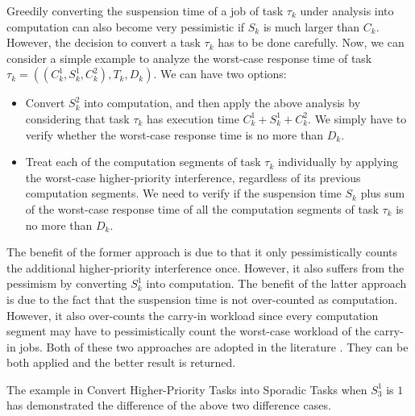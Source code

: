 \begin{table}[t]
\begin{table}[t]
 Greedily converting the suspension time of a job of task $\tau_k$ under analysis into computation can also become very pessimistic if $S_k$ is much larger than $C_k$. However, the decision to convert a task $\tau_k$ has to be done carefully. Now, we can consider a simple example to analyze the worst-case response time of task $\tau_k = ((C_k^1, S_k^1, C_k^2), T_k, D_k)$. We can have two options:
\begin{itemize}
\item Convert $S_k^2$ into computation, and then apply the above analysis by considering that task $\tau_k$ has execution time $C_k^1+S_k^1+C_k^2$. We simply have to verify whether the worst-case response time is no more than $D_k$.
\item Treat each of the computation segments of task $\tau_k$ individually by applying the worst-case higher-priority interference, regardless of its previous computation segments. We need to verify if the suspension time $S_k$ plus sum of the worst-case response time of all the computation segments of task $\tau_k$ is no more than $D_k$. 
\end{itemize}
The benefit of the former approach is due to that it only pessimistically counts the additional higher-priority interference once. However, it also suffers from the pessimism by converting $S_k^1$ into computation. The benefit of the latter approach is due to the fact that the suspension time is not over-counted as computation. However, it also over-counts the carry-in workload since every computation segment may have to pessimistically count the worst-case workload of the carry-in jobs. Both of these two approaches are adopted in the literature \cite{ecrts15nelissen,Huang:multiseg,RTCSA-BletsasA05}. They can be both applied and the better result is returned.

The example in Convert Higher-Priority Tasks into Sporadic Tasks when $S_3^1$ is $1$ has demonstrated the difference of the above two difference cases. 


\end{table}
\end{table}
